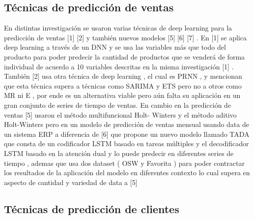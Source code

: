 \documentclass[conference]{IEEEtran}
\begin{document}
\subsection{Técnicas de predicción de ventas}
En distintas investigación se usaron varias técnicas de deep learning para la
predicción de ventas [1] [2] y también nuevos modelos [5] [6] [7] .
En [1] se aplica deep learning a través de un DNN y se usa las variables más que
todo del producto para poder predecir la cantidad de productos que se venderá de
forma individual de acuerdo a 10 variables descritas en la misma investigación [1] .
También [2] usa otra técnica de deep learning , el cual es PRNN , y mencionan que
esta técnica supera a técnicas como SARIMA y ETS pero no a otros como MR ni E ,
por ende es un alternativa viable pero aún falta su aplicación en un gran conjunto de
series de tiempo de ventas.
En cambio en la predicción de ventas [5] usaron el método multifuncional Holt-
Winters y el método aditivo Holt-Winters pero en un modelo de predicción de ventas
mensual usando data de un sistema ERP a diferencia de [6] que propone un nuevo
modelo llamado TADA que consta de un codificador LSTM basado en tareas
múltiples y el decodificador LSTM basado en la atención dual y lo puede predecir en
diferentes series de tiempo , ademas que usa dos dataset ( OSW y Favorita ) para
poder contractar los resultados de la aplicación del modelo en diferentes contexto lo
cual supera en aspecto de cantidad y variedad de data a [5]

\subsection{Técnicas de predicción de clientes}
\end{document}
